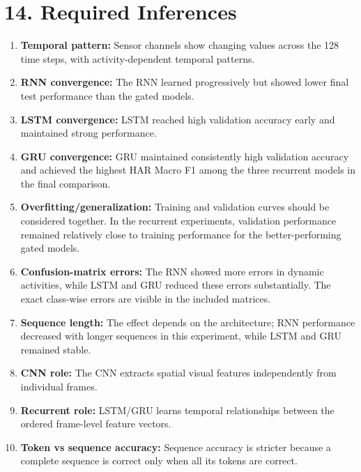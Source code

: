 \documentclass[10pt]{article}
\begin{document}
\section*{14. Required Inferences}
\begin{enumerate}
\item \textbf{Temporal pattern:} Sensor channels show changing values across the 128 time steps, with activity-dependent temporal patterns.
\item \textbf{RNN convergence:} The RNN learned progressively but showed lower final test performance than the gated models.
\item \textbf{LSTM convergence:} LSTM reached high validation accuracy early and maintained strong performance.
\item \textbf{GRU convergence:} GRU maintained consistently high validation accuracy and achieved the highest HAR Macro F1 among the three recurrent models in the final comparison.
\item \textbf{Overfitting/generalization:} Training and validation curves should be considered together. In the recurrent experiments, validation performance remained relatively close to training performance for the better-performing gated models.
\item \textbf{Confusion-matrix errors:} The RNN showed more errors in dynamic activities, while LSTM and GRU reduced these errors substantially. The exact class-wise errors are visible in the included matrices.
\item \textbf{Sequence length:} The effect depends on the architecture; RNN performance decreased with longer sequences in this experiment, while LSTM and GRU remained stable.
\item \textbf{CNN role:} The CNN extracts spatial visual features independently from individual frames.
\item \textbf{Recurrent role:} LSTM/GRU learns temporal relationships between the ordered frame-level feature vectors.
\item \textbf{Token vs sequence accuracy:} Sequence accuracy is stricter because a complete sequence is correct only when all its tokens are correct.
\end{enumerate}
\end{document}
